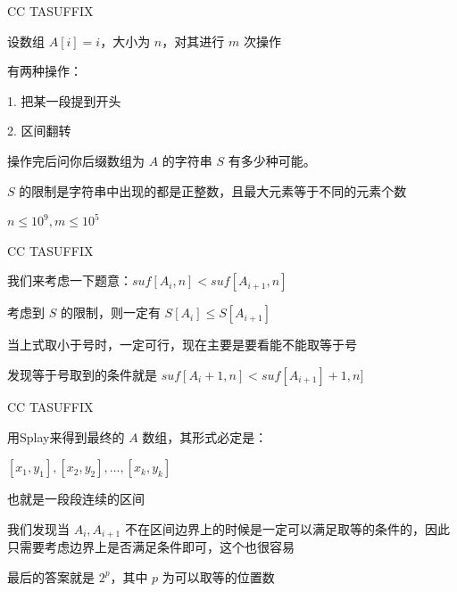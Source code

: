 \documentclass[UTF8]{beamer}
\begin{document}
			\begin{frame}{CC TASUFFIX}

			设数组 $A[i]=i$，大小为 $n$，对其进行 $m$ 次操作

			有两种操作：

			1. 把某一段提到开头

			2. 区间翻转

			操作完后问你后缀数组为 $A$ 的字符串 $S$ 有多少种可能。

			$S$ 的限制是字符串中出现的都是正整数，且最大元素等于不同的元素个数

			$n \le 10^9, m \le 10^5$

			\end{frame}

			\begin{frame}{CC TASUFFIX}

			我们来考虑一下题意：$suf[A_i,n] < suf[A_{i+1},n]$

			考虑到 $S$ 的限制，则一定有 $S[A_i] \le S[A_{i+1}]$

			当上式取小于号时，一定可行，现在主要是要看能不能取等于号

			发现等于号取到的条件就是 $suf[A_i+1,n] < suf[A_{i+1}]+1,n]$

			\end{frame}

			\begin{frame}{CC TASUFFIX}

			用Splay来得到最终的 $A$ 数组，其形式必定是：

			$[x_1,y_1], [x_2,y_2], ..., [x_k,y_k]$

			也就是一段段连续的区间

			我们发现当 $A_i, A_{i+1}$ 不在区间边界上的时候是一定可以满足取等的条件的，因此只需要考虑边界上是否满足条件即可，这个也很容易

			最后的答案就是 $2^p$，其中 $p$ 为可以取等的位置数

			\end{frame}
\end{document}
